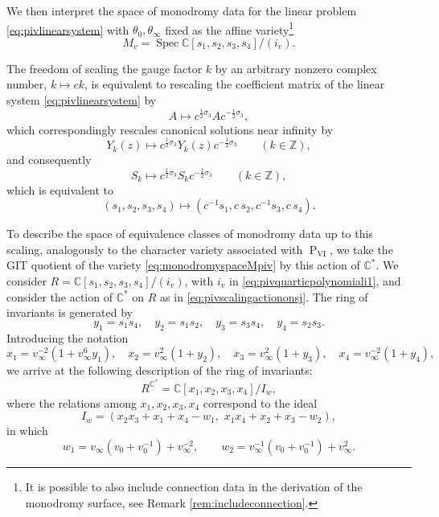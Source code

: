 \documentclass[a4paper,reqno]{amsart}
\numberwithin{equation}{section}
\newcommand{\C}{\mathbb{C}}
\newcommand{\pain}[1]{\operatorname{P}_{\mathrm{#1}}}
\numberwithin{equation}{section}
\begin{document}
We then interpret the space of monodromy data
 for the linear problem \eqref{eq:pivlinearsystem} with $\theta_0,\theta_{\infty}$ fixed as the affine variety\footnote{It is possible to also include connection data in the derivation of the monodromy surface, see Remark \ref{rem:includeconnection}.}
\begin{equation} \label{eq:monodromyspaceMpiv}
    M_v = \operatorname{Spec} \C [s_1,s_2,s_3,s_4]/(i_v).
\end{equation}

The freedom of scaling the gauge factor $k$ by an arbitrary nonzero complex number, $k\mapsto c k$, is equivalent to rescaling the coefficient matrix of the linear system \eqref{eq:pivlinearsystem} by
\begin{equation*}
    A\mapsto c^{\frac{1}{2}\sigma_3} A c^{-\frac{1}{2}\sigma_3},
\end{equation*}
which correspondingly rescales canonical solutions near infinity by
\begin{equation*}
    Y_k(z)\mapsto c^{\frac{1}{2}\sigma_3} Y_k(z) c^{-\frac{1}{2}\sigma_3}\qquad (k\in\mathbb{Z}),
\end{equation*}
and consequently 
\begin{equation*}
    S_k\mapsto c^{\frac{1}{2}\sigma_3} S_k c^{-\frac{1}{2}\sigma_3}\qquad (k\in\mathbb{Z}),
\end{equation*}
which is equivalent to
\begin{equation} \label{eq:pivscalingactiononsj}
 (s_1,s_2,s_3,s_4)\mapsto  (c^{-1}s_1,c\, s_2,c^{-1}s_3,c\, s_4).
\end{equation}

To describe the space of equivalence classes of monodromy data up to this scaling, analogously to the character variety associated with $\pain{VI}$, we take the GIT quotient of the variety \eqref{eq:monodromyspaceMpiv} by this action of $\C^*$.
We consider $R=\C [s_1,s_2,s_3,s_4]/(i_v)$, with $i_v$ in \eqref{eq:pivquarticpolynomiali1}, and consider the action of $\C^*$ on $R$ as in \eqref{eq:pivscalingactiononsj}.
The ring of invariants is generated by 
\begin{equation}\label{eq:ytosPIV}
    y_1 = s_1 s_4 ,\quad y_2 = s_1 s_2, \quad y_3 = s_3 s_4, \quad y_4 = s_2 s_3.
\end{equation}
Introducing the notation
\begin{equation} \label{eq:xtoyPIV}
    x_1 = v_{\infty}^{-2}(1+v_{\infty}^6 y_1), \quad x_2 = v_{\infty}^2( 1 + y_2 ),\quad x_3 = v_{\infty}^2( 1 + y_3 ), \quad x_4 = v_{\infty}^{-2}(1+y_4),
\end{equation}
we arrive at the following description of the ring of invariants: 
$$ R^{\C^*} =  \C[x_1,x_2,x_3,x_4]/I_{w},$$ where the relations among $x_1,x_2,x_3,x_4$ correspond to the ideal 
\begin{equation}\label{piv:idealIw}
    I_{w} = (x_2x_3+x_1+x_4-w_1, \,\,x_1 x_4+x_2+x_3-w_2),
\end{equation} 
in which
\begin{equation*} 
    w_1 =  v_{\infty}\left(v_0  + v_0^{-1}\right)+ {v_{\infty}^{-2}}, \qquad 
w_2 = v_{\infty}^{-1}\left(v_0+v_0^{-1}\right)+v_{\infty}^2.
\end{equation*}
\end{document}
